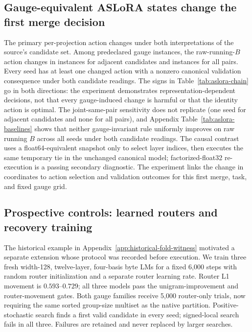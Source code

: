 

\subsection{Gauge-equivalent ASLoRA states change the first merge decision}
\label{sec:aslora-results}



The primary per-projection action changes under both interpretations of
the source's candidate set.  Among \ASLORATotalGaugeInstances{} predeclared gauge instances,
the raw-running-$B$ action changes in
\ASLORAAdjacentPrimaryChanges{} instances for adjacent candidates and
\ASLORAAllPrimaryChanges{} instances for all pairs.  Every seed has at least
one changed action with a nonzero canonical validation consequence under both
candidate readings.  The signs in Table~\ref{tab:aslora-chain} go in both
directions: the experiment demonstrates representation-dependent decisions,
not that every gauge-induced change is harmful or that the identity action is
optimal.  The joint-same-pair sensitivity does not replicate (one seed for
adjacent candidates and none for all pairs), and Appendix
Table~\ref{tab:aslora-baselines} shows that neither gauge-invariant rule
uniformly improves on raw running \(B\) across all seeds under both candidate
readings.  The causal contrast uses a
float64-equivalent snapshot only to select layer indices, then executes the
same temporary tie in the unchanged canonical model; factorized-float32
re-execution is a passing secondary diagnostic.  The experiment links the change in coordinates to action selection and
validation outcomes for this first merge, task, and fixed gauge grid.

\subsection{Prospective controls: learned routers and recovery training}
\label{sec:enhanced-decisions}

The historical example in Appendix~\ref{app:historical-fold-witness}
motivated a separate extension whose protocol was recorded before execution. We train three fresh width-128, twelve-layer,
four-basis byte LMs for a fixed 6,000 steps with random router initialization
and a separate router learning rate. Router L1 movement is $0.593$--$0.729$;
all three models pass the unigram-improvement and router-movement gates.
Both gauge families receive 5,000 router-only trials, now requiring the same
sorted group-size multiset as the native partition. Positive-stochastic
search finds a first valid candidate in every seed; signed-local search fails
in all three. Failures are retained and never replaced by larger searches.


